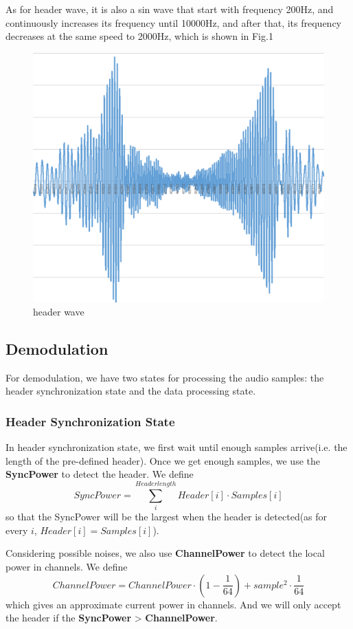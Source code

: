 \documentclass[11pt, conference]{IEEEtran}
\begin{document}
As for header wave, it is also a sin wave that start with frequency 200Hz, and continuously increases its frequency until 10000Hz, and after that, its
frequency decreases at the same speed to 2000Hz, which is shown in Fig.1

\begin{figure}[!h]
	\centering
	\includegraphics[scale=0.4]{header_wave.png}
	\caption{header wave}\label{}
	\end{figure}

\subsection{{Demodulation}}
    For demodulation, we have two states for processing the audio samples: the header synchronization state and the data processing state.
\subsubsection{Header Synchronization State}
    In header synchronization state, we first wait until enough samples arrive(i.e. the length of the pre-defined header). Once we get enough samples, we use the \textbf{SyncPower}
    to detect the header. We define $$SyncPower = \sum_{i}^{Headerlength} Header[i] \cdot Samples[i]$$
    so that the SyncPower will be the largest when the header is detected(as for every $i$, $Header[i] = Samples[i]$).

    Considering possible noises, we also use \textbf{ChannelPower} to detect the local power in channels. We define
    $$ChannelPower = ChannelPower\cdot (1 - \frac{1}{64}) + sample^2 \cdot \frac{1}{64}$$
    which gives an approximate current power in channels. And we will only accept the header if the \textbf{SyncPower} > \textbf{ChannelPower}.
\end{document}
